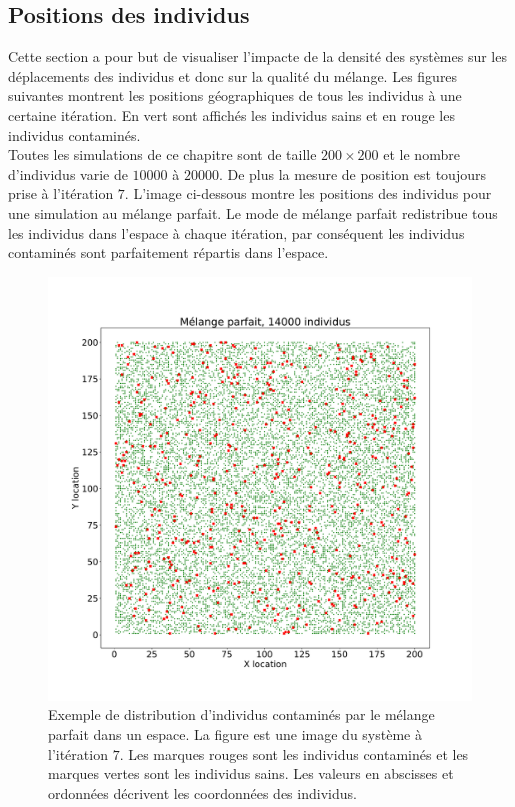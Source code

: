 \subsection{Positions des individus}

Cette section a pour but de visualiser l'impacte de la densité des systèmes sur les déplacements des individus et donc sur la qualité du mélange. Les figures suivantes montrent les positions géographiques de tous les individus à une certaine itération. En vert sont affichés les individus sains et en rouge les individus contaminés.\\

Toutes les simulations de ce chapitre sont de taille $200 \times 200$ et le nombre d'individus varie de $10000$ à $20000$. De plus la mesure de position est toujours prise à l'itération $7$. L'image ci-dessous montre les positions des individus pour une simulation au mélange parfait. Le mode de mélange parfait redistribue tous les individus dans l'espace à chaque itération, par conséquent les individus contaminés sont parfaitement répartis dans l'espace.

\begin{figure}[h]
	\centering
	\captionsetup{justification=centering}
	\includegraphics[width=.7\textwidth]{Images/SI_positions_14k_mix.pdf}
	\caption[Positions des individus : mélange parfait]{Exemple de distribution d'individus contaminés par le mélange parfait dans un espace. La figure est une image du système à l'itération $7$. Les marques rouges sont les individus contaminés et les marques vertes sont les individus sains. Les valeurs en abscisses et ordonnées décrivent les coordonnées des individus.}
\end{figure}

